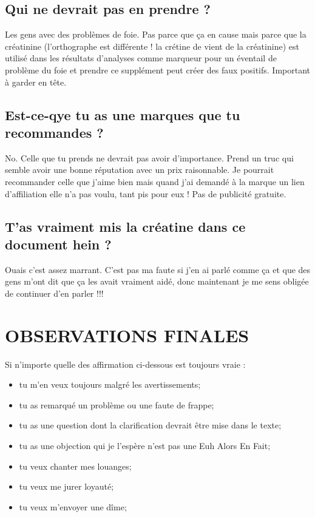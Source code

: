 \documentclass{article}
\begin{document}
\subsection{Qui ne devrait pas en prendre ?}

Les gens avec des problèmes de foie. Pas parce que ça en cause mais parce que la créatinine (l'orthographe est différente ! la crétine de vient de la créatinine) est utilisé dans les résultats d'analyses comme marqueur pour un éventail de problème du foie et prendre ce supplément peut créer des faux positifs. Important à garder en tête.

\subsection{Est-ce-qye tu as une marques que tu recommandes ?}

No. Celle que tu prends ne devrait pas avoir d'importance. Prend un truc qui semble avoir une bonne réputation avec un prix raisonnable. Je pourrait recommander celle que j'aime bien mais quand j'ai demandé à la marque un lien d'affiliation elle n'a pas voulu, tant pis pour eux ! Pas de publicité gratuite. 

\subsection{T'as vraiment mis la créatine dans ce document hein ?}

Ouais c'est assez marrant. C'est pas ma faute si j'en ai parlé comme ça et que des gens m'ont dit que ça les avait vraiment aidé, donc maintenant je me sens obligée de continuer d'en parler !!!

 

\section{OBSERVATIONS FINALES}

Si n'importe quelle des affirmation ci-dessous est toujours vraie :

\begin{itemize}
\item tu m'en veux toujours malgré les avertissements;

\item tu as remarqué un problème ou une faute de frappe;

\item tu as une question dont la clarification devrait être mise dans le texte;

\item tu as une objection qui je l'espère n'est pas une Euh Alors En Fait;

\item tu veux chanter mes louanges;

\item tu veux me jurer loyauté; 

\item tu veux m'envoyer une dîme;
\end{itemize}
\end{document}
